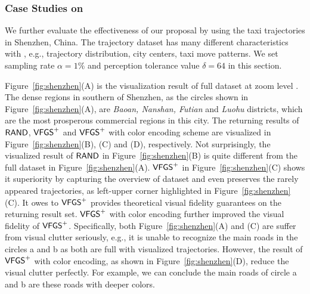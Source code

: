 



\subsubsection{Case Studies on \sz}\label{sec:sz}
We further evaluate the effectiveness of our proposal by using the taxi trajectories in Shenzhen, China.
The \sz{} trajectory dataset has many different characteristics with \pt{}, e.g., trajectory distribution, city centers, taxi move patterns.
We set sampling rate $\alpha=1\%$ and perception tolerance value $\delta = 64$ in this section.

Figure~\ref{fig:shenzhen}(A) is the visualization result of full \sz{} dataset at zoom level .
The dense regions in southern of Shenzhen, as the circles shown in Figure~\ref{fig:shenzhen}(A), are \emph{Baoan, Nanshan, Futian} and \emph{Luohu} districts,
which are the most prosperous commercial regions in this city.
The returning results of $\mathsf{RAND}$, $\mathsf{VFGS}^{+}$ and $\mathsf{VFGS}^{+}$ with color encoding scheme are visualized in Figure~\ref{fig:shenzhen}(B), (C) and (D), respectively.
Not surprisingly,  the visualized result of $\mathsf{RAND}$ in Figure~\ref{fig:shenzhen}(B) is quite different from the full dataset in Figure~\ref{fig:shenzhen}(A).
$\mathsf{VFGS}^{+}$ in Figure~\ref{fig:shenzhen}(C) shows it superiority by capturing the overview of \sz{} dataset and even preserves the rarely appeared trajectories, as left-upper corner highlighted in  Figure~\ref{fig:shenzhen}(C).
It owes to $\mathsf{VFGS}^{+}$ provides theoretical visual fidelity guarantees on the returning result set.
$\mathsf{VFGS}^{+}$ with color encoding further improved the visual fidelity of $\mathsf{VFGS}^{+}$.
Specifically, both Figure~\ref{fig:shenzhen}(A) and (C) are suffer from visual clutter seriously,
e.g., it is unable to recognize the main roads in the circles a and b as both are full with visualized trajectories.
However, the result of $\mathsf{VFGS}^{+}$ with color encoding, as shown in Figure~\ref{fig:shenzhen}(D), reduce the visual clutter perfectly.
For example, we can conclude the main roads of circle a and b are these roads with deeper colors.

